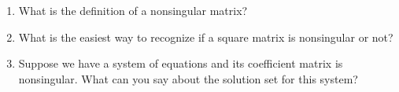 \begin{enumerate}
%
\item What is the definition of a nonsingular matrix?
%
\item What is the easiest way to recognize if a square matrix is nonsingular or not?
%
\item Suppose we have a system of equations and its coefficient matrix is nonsingular.  What can you say about the solution set for this system?
%
\end{enumerate}

